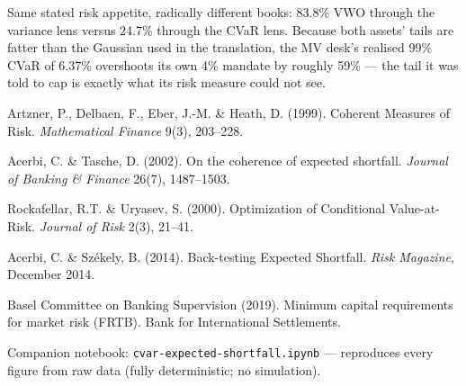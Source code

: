 \documentclass{pyportfolios-note}
\begin{document}
Same stated risk appetite, radically different books: 83.8\% VWO through the
variance lens versus 24.7\% through the CVaR lens. Because both assets' tails are
fatter than the Gaussian used in the translation, the MV desk's realised 99\%
CVaR of 6.37\% overshoots its own 4\% mandate by roughly 59\% — the tail it was
told to cap is exactly what its risk measure could not see.


\noteneedroom{200bp}
\begin{notereferences}
\item Artzner, P., Delbaen, F., Eber, J.-M. \& Heath, D. (1999). Coherent
      Measures of Risk. \textit{Mathematical Finance} 9(3), 203–228.
\item Acerbi, C. \& Tasche, D. (2002). On the coherence of expected shortfall.
      \textit{Journal of Banking \& Finance} 26(7), 1487–1503.
\item Rockafellar, R.T. \& Uryasev, S. (2000). Optimization of Conditional
      Value-at-Risk. \textit{Journal of Risk} 2(3), 21–41.
\item Acerbi, C. \& Székely, B. (2014). Back-testing Expected Shortfall.
      \textit{Risk Magazine}, December 2014.
\item Basel Committee on Banking Supervision (2019). Minimum capital
      requirements for market risk (FRTB). Bank for International Settlements.
\item Companion notebook: \texttt{cvar-expected-shortfall.ipynb} — reproduces
      every figure from raw data (fully deterministic; no simulation).
\end{notereferences}
\end{document}
